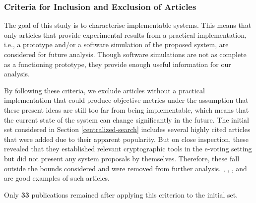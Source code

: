 \documentclass[../access.tex]{subfiles}
\begin{document}
    \subsubsection{Criteria for Inclusion and Exclusion of Articles}
    \label{inclusion_exclusion_classification_criteria}
    The goal of this study is to characterise implementable systems. This means that only articles that provide experimental results from a practical implementation, i.e., a prototype and/or a software simulation of the proposed system, are considered for future analysis. Though software simulations are not as complete as a functioning prototype, they provide enough useful information for our analysis.
    \par
    By following these criteria, we exclude articles without a practical implementation that could produce objective metrics under the assumption that these present ideas are still too far from being implementable, which means that the current state of the system can change significantly in the future. The initial set considered in Section \ref{centralized-search} includes several highly cited articles that were added due to their apparent popularity. But on close inspection, these revealed that they established relevant cryptographic tools in the e-voting setting but did not present any system proposals by themselves. Therefore, these fall outside the bounds considered and were removed from further analysis. \cite{Diffie1976}, \cite{Pedersen1991}, \cite{Chaum1988a}, \cite{Chaum1982} and \cite{ElGamal1984} are good examples of such articles.
    \par
    Only \textbf{33} publications remained after applying this criterion to the initial set.
    
\end{document}
